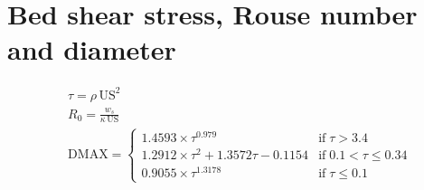 \documentclass{article}
\newcommand{\US}{\mathrm{US}}
\newcommand{\DMAX}{\mathrm{DMAX}}
\newcommand{\IF}{\mathrm{if}\;}
\begin{document}
\section{Bed shear stress, Rouse number and diameter}
\[\begin{aligned}
& \tau = \rho \,\US^2\\
& R_0 = \frac{w_s}{\kappa\, \US}\\
& \DMAX = \begin{cases}
     1.4593 \times \tau^{0.979} &\IF   \tau > 3.4 \\
     1.2912 \times \tau^2 + 1.3572 \tau - 0.1154 
    &\IF 0.1 < \tau \leqslant 0.34 \\
     0.9055 \times \tau^{1.3178} &\IF \tau \leqslant 0.1
  \end{cases}
\end{aligned}\]
\end{document}
